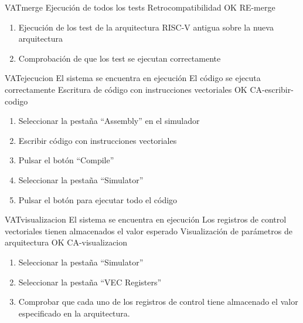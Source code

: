 \begin{testCase}{VAT}{merge}
    {\NA}
    {Ejecución de todos los tests}
    {Retrocompatibilidad}
    {OK} %
    {RE-merge}
    \begin{enumerate}
        \item Ejecución de los test de la arquitectura RISC-V antigua sobre la nueva arquitectura
        \item Comprobación de que los test se ejecutan correctamente
    \end{enumerate}
\end{testCase}

\begin{testCase}{VAT}{ejecucion}
    {El sistema se encuentra en ejecución}
    {El código se ejecuta correctamente}
    {Escritura de código con instrucciones vectoriales} %
    {OK} %
    {CA-escribir-codigo}
    \begin{enumerate}
        \item Seleccionar la pestaña ``Assembly'' en el simulador
        \item Escribir código con instrucciones vectoriales
        \item Pulsar el botón ``Compile''
        \item Seleccionar la pestaña ``Simulator''
        \item Pulsar el botón para ejecutar todo el código
    \end{enumerate}
\end{testCase}


\begin{testCase}{VAT}{visualizacion}
    {El sistema se encuentra en ejecución}
    {Los registros de control vectoriales tienen almacenados el valor esperado}
    {Visualización de parámetros de arquitectura} %
    {OK} %
    {CA-visualizacion}
    \begin{enumerate}
        \item Seleccionar la pestaña ``Simulator''
        \item Seleccionar la pestaña ``VEC Registers''
        \item Comprobar que cada uno de los registros de control tiene almacenado el valor especificado en la arquitectura.
    \end{enumerate}
\end{testCase}

